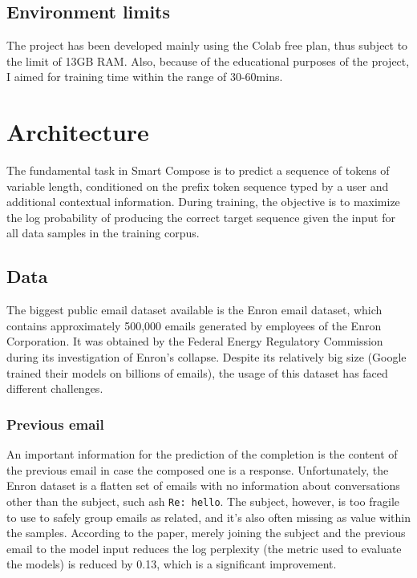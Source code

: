 \documentclass{article}
\begin{document}
\subsection{Environment limits}\label{environment-limits}

The project has been developed mainly using the Colab free plan, thus subject to the limit of 13GB RAM. Also, because of the educational purposes of the project, I aimed for training time within the range of 30-60mins.

\section{Architecture}\label{architecture}

The fundamental task in Smart Compose is to predict a sequence of tokens of variable length, conditioned on the prefix token sequence typed by a user and additional contextual information. During training, the objective is to maximize the log probability of producing the correct target sequence given the input for all data samples in the training corpus.

\subsection{Data}\label{data}

The biggest public email dataset available is the Enron email dataset, which contains approximately 500,000 emails generated by employees of the Enron Corporation. It was obtained by the Federal Energy Regulatory Commission during its investigation of Enron's collapse. Despite its relatively big size (Google trained their models on billions of emails), the usage of this dataset has faced different challenges.

\subsubsection{Previous email}

An important information for the prediction of the completion is the content of the previous email in case the composed one is a response. Unfortunately, the Enron dataset is a flatten set of emails with no information about conversations other than the subject, such ash \texttt{Re:\ hello}. The subject, however, is too fragile to use to safely group emails as related, and it's also often missing as value within the samples. According to the paper, merely joining the subject and the previous email to the model input reduces the log perplexity (the metric used to evaluate the models) is reduced by 0.13, which is a significant improvement.
\end{document}
